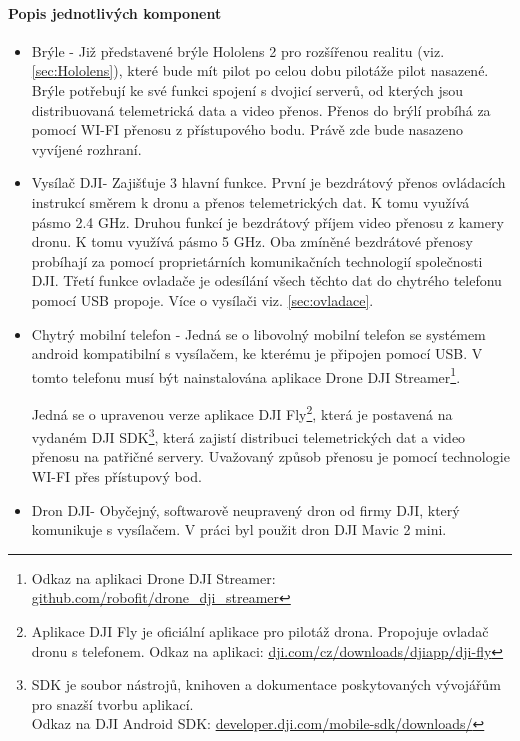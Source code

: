 \paragraph{Popis jednotlivých komponent}
\begin{itemize}
    \item Brýle - Již představené brýle Hololens 2 pro rozšířenou realitu (viz. \ref{sec:Hololens}), které bude mít pilot po celou dobu pilotáže pilot nasazené. Brýle potřebují ke své funkci spojení s dvojicí serverů, od kterých jsou distribuovaná telemetrická data a video přenos. Přenos do brýlí probíhá za pomocí WI-FI přenosu z přístupového bodu. Právě zde bude nasazeno vyvíjené rozhraní. 
   
    \item Vysílač  DJI\texttrademark- Zajišťuje 3 hlavní funkce. První je bezdrátový přenos ovládacích instrukcí směrem k dronu a přenos telemetrických dat. K tomu využívá pásmo 2.4 GHz. Druhou funkcí je bezdrátový příjem video přenosu z kamery dronu. K tomu využívá pásmo 5 GHz. Oba zmíněné bezdrátové přenosy probíhají za pomocí proprietárních komunikačních technologií společnosti DJI\texttrademark. Třetí funkce ovladače je odesílání všech těchto dat do chytrého telefonu pomocí USB propoje. Více o vysílači viz. \ref{sec:ovladace}.
    
    \item Chytrý mobilní telefon - Jedná se o libovolný mobilní telefon se systémem android kompatibilní s vysílačem, ke kterému je připojen pomocí USB. V tomto telefonu musí být nainstalována  aplikace Drone DJI Streamer\footnote{Odkaz na aplikaci Drone DJI Streamer: \href{https://github.com/robofit/drone\_dji\_streamer}{github.com/robofit/drone\_dji\_streamer}}. 

    
    Jedná se o upravenou verze aplikace DJI Fly\footnote{Aplikace DJI Fly je oficiální aplikace pro pilotáž drona. Propojuje ovladač dronu s telefonem. Odkaz na aplikaci: \href{https://www.dji.com/cz/downloads/djiapp/dji-fly}{dji.com/cz/downloads/djiapp/dji-fly}  }, která je postavená na vydaném DJI SDK\footnote{SDK je soubor nástrojů, knihoven a dokumentace poskytovaných vývojářům pro snazší tvorbu aplikací. \\ Odkaz na DJI Android SDK: \href{https://developer.dji.com/mobile-sdk/downloads/}{developer.dji.com/mobile-sdk/downloads/}},  která zajistí distribuci telemetrických dat a video přenosu na patřičné servery. Uvažovaný způsob přenosu je pomocí technologie WI-FI přes přístupový bod. 
   
    \item Dron DJI\texttrademark \space - Obyčejný, softwarově neupravený dron od firmy DJI\texttrademark, který komunikuje s vysílačem. V práci byl použit dron DJI Mavic 2 mini.
   

\end{itemize}
